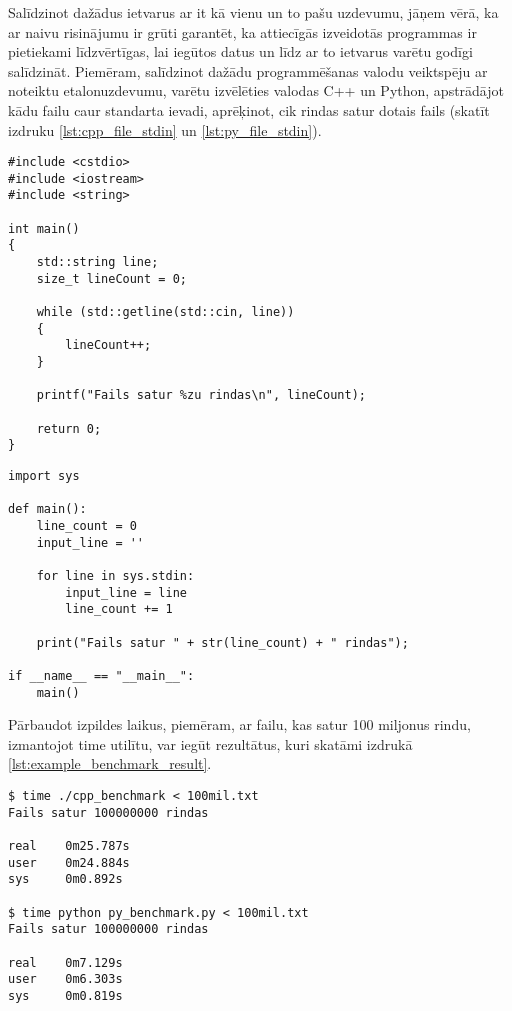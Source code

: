 Salīdzinot dažādus ietvarus ar it kā vienu un to pašu uzdevumu, jāņem vērā, ka
ar naivu risinājumu ir grūti garantēt, ka attiecīgās izveidotās programmas ir
pietiekami līdzvērtīgas, lai iegūtos datus un līdz ar to ietvarus varētu godīgi
salīdzināt. Piemēram, salīdzinot dažādu programmēšanas valodu veiktspēju ar noteiktu
etalonuzdevumu, varētu izvēlēties valodas C++ un Python, apstrādājot kādu failu
caur standarta ievadi, aprēķinot, cik rindas satur dotais fails (skatīt izdruku
\ref{lst:cpp_file_stdin} un \ref{lst:py_file_stdin}).

\begin{lstlisting}[caption={Vienkārša faila apstrāde valodā C++ caur standarta ievadi},
  label=lst:cpp_file_stdin,
  captionpos=b
]
#include <cstdio>
#include <iostream>
#include <string>

int main()
{
	std::string line;
	size_t lineCount = 0;

	while (std::getline(std::cin, line))
	{
		lineCount++;
	}

	printf("Fails satur %zu rindas\n", lineCount);

	return 0;
}
\end{lstlisting}


\begin{lstlisting}[caption={Vienkārša faila apstrāde Python valodā caur standarta ievadi},
  label=lst:py_file_stdin,
  captionpos=b
]
import sys 

def main():
    line_count = 0
    input_line = ''

    for line in sys.stdin:
        input_line = line
        line_count += 1

    print("Fails satur " + str(line_count) + " rindas");

if __name__ == "__main__":
    main()
\end{lstlisting}

Pārbaudot izpildes laikus, piemēram, ar failu, kas satur 100 miljonus rindu,
izmantojot time \cite{time_man_page} utilītu, var iegūt rezultātus, kuri skatāmi
izdrukā \ref{lst:example_benchmark_result}.

\begin{lstlisting}[caption={Etalonuzdevuma rezultāti failam ar 100 miljoniem rindu},
  label=lst:example_benchmark_result,
  captionpos=b
]
$ time ./cpp_benchmark < 100mil.txt 
Fails satur 100000000 rindas

real    0m25.787s
user    0m24.884s
sys     0m0.892s

$ time python py_benchmark.py < 100mil.txt 
Fails satur 100000000 rindas

real    0m7.129s
user    0m6.303s
sys     0m0.819s
\end{lstlisting}

